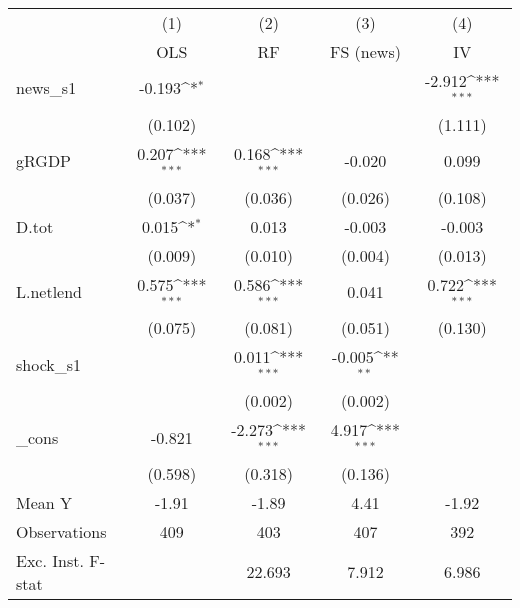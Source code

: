 {
\def\sym#1{\ifmmode^{#1}\else\(^{#1}\)\fi}
\begin{tabular}{l*{4}{c}}
\toprule
            &\multicolumn{1}{c}{(1)}&\multicolumn{1}{c}{(2)}&\multicolumn{1}{c}{(3)}&\multicolumn{1}{c}{(4)}\\
            &\multicolumn{1}{c}{OLS}&\multicolumn{1}{c}{RF}&\multicolumn{1}{c}{FS (news)}&\multicolumn{1}{c}{IV}\\
\midrule
news\_s1     &      -0.193\sym{*}  &                     &                     &      -2.912\sym{***}\\
            &     (0.102)         &                     &                     &     (1.111)         \\
\addlinespace
gRGDP       &       0.207\sym{***}&       0.168\sym{***}&      -0.020         &       0.099         \\
            &     (0.037)         &     (0.036)         &     (0.026)         &     (0.108)         \\
\addlinespace
D.tot       &       0.015\sym{*}  &       0.013         &      -0.003         &      -0.003         \\
            &     (0.009)         &     (0.010)         &     (0.004)         &     (0.013)         \\
\addlinespace
L.netlend   &       0.575\sym{***}&       0.586\sym{***}&       0.041         &       0.722\sym{***}\\
            &     (0.075)         &     (0.081)         &     (0.051)         &     (0.130)         \\
\addlinespace
shock\_s1    &                     &       0.011\sym{***}&      -0.005\sym{**} &                     \\
            &                     &     (0.002)         &     (0.002)         &                     \\
\addlinespace
\_cons      &      -0.821         &      -2.273\sym{***}&       4.917\sym{***}&                     \\
            &     (0.598)         &     (0.318)         &     (0.136)         &                     \\
\midrule
Mean Y      &       -1.91         &       -1.89         &        4.41         &       -1.92         \\
Observations&         409         &         403         &         407         &         392         \\
Exc. Inst. F-stat&                     &      22.693         &       7.912         &       6.986         \\
\bottomrule
\end{tabular}
}

